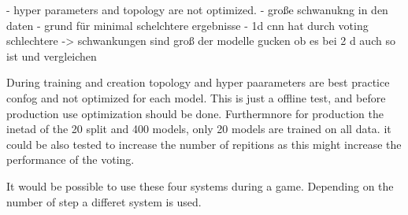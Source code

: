 - hyper parameters and topology are not optimized. 
- große schwanukng in den daten
- grund für minimal schelchtere ergebnisse 
- 1d cnn hat durch voting schlechtere -> schwankungen sind groß der modelle
gucken ob es bei 2 d auch so ist und vergleichen 

During training and creation topology and hyper paarameters are best practice confog and not optimized for each model. This is just a offline test, and before production use optimization should be done. Furthermnore for production the inetad of the 20 split and 400 models, only 20 models are trained on all data. it could be also tested to increase the number of repitions as this might increase the performance of the voting. 

It would be possible to use these four systems during a game. Depending on the number of step a differet system is used. 